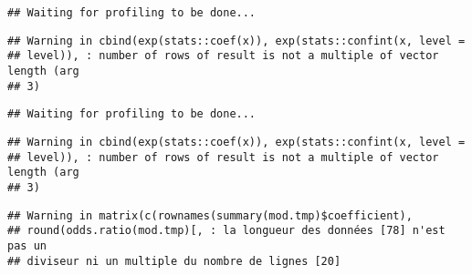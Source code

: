 \documentclass[]{article}
\newenvironment{Shaded}{\begin{snugshade}}{\end{snugshade}}
\newcommand{\KeywordTok}[1]{\textcolor[rgb]{0.13,0.29,0.53}{\textbf{#1}}}
\newcommand{\DataTypeTok}[1]{\textcolor[rgb]{0.13,0.29,0.53}{#1}}
\newcommand{\StringTok}[1]{\textcolor[rgb]{0.31,0.60,0.02}{#1}}
\newcommand{\OperatorTok}[1]{\textcolor[rgb]{0.81,0.36,0.00}{\textbf{#1}}}
\newcommand{\NormalTok}[1]{#1}
\begin{document}
\begin{verbatim}
## Waiting for profiling to be done...
\end{verbatim}

\begin{verbatim}
## Warning in cbind(exp(stats::coef(x)), exp(stats::confint(x, level =
## level)), : number of rows of result is not a multiple of vector length (arg
## 3)
\end{verbatim}

\begin{verbatim}
## Waiting for profiling to be done...
\end{verbatim}

\begin{verbatim}
## Warning in cbind(exp(stats::coef(x)), exp(stats::confint(x, level =
## level)), : number of rows of result is not a multiple of vector length (arg
## 3)
\end{verbatim}

\begin{verbatim}
## Warning in matrix(c(rownames(summary(mod.tmp)$coefficient),
## round(odds.ratio(mod.tmp)[, : la longueur des données [78] n'est pas un
## diviseur ni un multiple du nombre de lignes [20]
\end{verbatim}

\begin{Shaded}
\end{Shaded}
\end{document}
